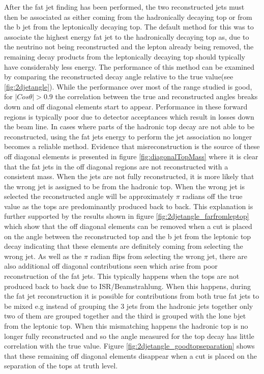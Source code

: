 After the fat jet finding has been performed, the two reconstructed jets must then be associated as either coming from the hadronically decaying top or from the b jet from the leptonically decaying top. The default method for this was to associate the highest energy fat jet to the hadronically decaying top as, due to the neutrino not being reconstructed and the lepton already being removed, the remaining decay products from the leptonically decaying top should typically have considerably less energy. The performance of this method can be examined by comparing the reconstructed decay angle relative to the true value(see \ref{fig:2djetangle}). While the performance over most of the range studied is good, for $\mid Cos\theta \mid>0.9$ the correlation between the true and reconstructed angles breaks down and off diagonal elements start to appear. Performance in these forward regions is typically poor due to detector acceptances which result in losses down the beam line. In cases where parts of the hadronic top decay are not able to be reconstructed, using the fat jets energy to perform the jet association no longer becomes a reliable method. Evidence that misreconstruction is the source of these off diagonal elements is presented in figure \ref{fig:diagonalTopMass} where it is clear that the fat jets in the off diagonal regions are not reconstructed with a consistent mass. When the jets are not fully reconstructed, it is more likely that the wrong jet is assigned to be from the hadronic top. When the wrong jet is selected the reconstructed angle will be approximately $\pi$ radians off the true value as the tops are predominantly produced back to back. This explanation is further supported by the results shown in figure \ref{fig:2djetangle_farfromleptop} which show that the off diagonal elements can be removed when a cut is placed on the angle between the reconstructed top and the b jet from the leptonic top decay indicating that these elements are definitely coming from selecting the wrong jet. As well as the $\pi$ radian flips from selecting the wrong jet, there are also additional off diagonal contributions seen which arise from poor reconstruction of the fat jets. This typically happens when the tops are not produced back to back due to ISR/Beamstrahlung. When this happens, during the fat jet reconstruction it is possible for contributions from both true fat jets to be mixed e.g instead of grouping the 3 jets from the hadronic jets together only two of them are grouped together and the third is grouped with the lone bjet from the leptonic top. When this mismatching happens the hadronic top is no longer fully reconstructed and so the angle measured for the top decay has little correlation with the true value. Figure \ref{fig:2djetangle_goodtopseparation} shows that these remaining off diagonal elements disappear when a cut is placed on the separation of the tops at truth level. 

